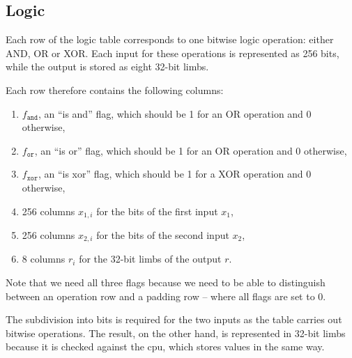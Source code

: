 \subsection{Logic}
\label{logic}

Each row of the logic table corresponds to one bitwise logic operation: either AND, OR or XOR. Each input for these operations is represented as 256 bits, while the output is stored as eight 32-bit limbs. 

Each row therefore contains the following columns:
\begin{enumerate}
    \item $f_{\texttt{and}}$, an ``is and'' flag, which should be 1 for an OR operation and 0 otherwise,
    \item $f_{\texttt{or}}$, an ``is or'' flag, which should be 1 for an OR operation and 0 otherwise,
    \item $f_{\texttt{xor}}$, an ``is xor'' flag, which should be 1 for a XOR operation and 0 otherwise,
    \item 256 columns $x_{1, i}$ for the bits of the first input $x_1$,
    \item 256 columns $x_{2, i}$ for the bits of the second input $x_2$,
    \item 8 columns $r_i$ for the 32-bit limbs of the output $r$.
\end{enumerate}

Note that we need all three flags because we need to be able to distinguish between an operation row and a padding row -- where all flags are set to 0.

The subdivision into bits is required for the two inputs as the table carries out bitwise operations. The result, on the other hand, is represented in 32-bit limbs because it is checked against the cpu, which stores values in the same way. 
